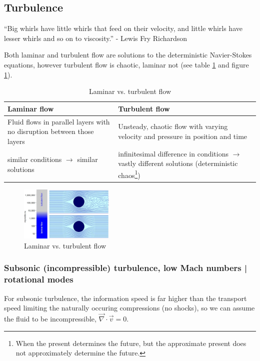 \subsection{Turbulence}
\enquote{Big whirls have little whirls that feed on their velocity, and little whirls have lesser whirls and so on to viscosity.} - Lewis Fry Richardson

Both laminar and turbulent flow are solutions to the 
deterministic Navier-Stokes equations, however turbulent flow
is chaotic, laminar not (see table \ref{tab:turbulence} and figure \ref{fig:turbulence}).

\begin{table}[!htb]
    \centering
    \begin{tabular}{|p{}|p{}|}
        \hline
        \textbf{Laminar flow} & \textbf{Turbulent flow} \\
        \hline
        Fluid flows in parallel layers with no disruption between those layers & Unsteady, chaotic flow with varying velocity and pressure in position and time \\
        \hline
        similar conditions $\rightarrow$ similar solutions & infinitesimal difference in conditions $\rightarrow$ vastly different solutions (deterministic chaos\footnote{When the present determines the future, but the approximate present does not approximately determine the future.}) \\
        \hline
    \end{tabular}
    \caption{Laminar vs. turbulent flow}
    \label{tab:turbulence}
\end{table}

\begin{figure}[!htb]
    \centering
    \includegraphics[width=0.4\textwidth]{figures/turbulence.png}
    \caption{Laminar vs. turbulent flow}
    \label{fig:turbulence}
\end{figure}

\subsubsection{Subsonic (incompressible) turbulence, low Mach numbers | rotational modes}
For subsonic turbulence, the information speed is far higher than the transport speed limiting
the naturally occuring compressions (no shocks), so we can assume the fluid to be incompressible, $\vec{\nabla} \cdot \vec{v} = 0$.

